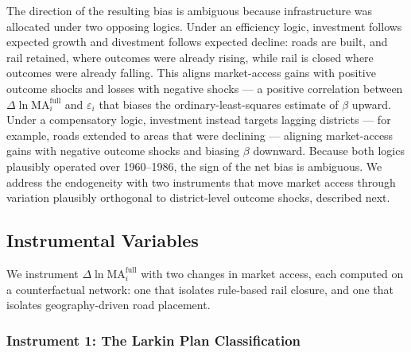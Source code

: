 The direction of the resulting bias is ambiguous because
infrastructure was allocated under two opposing logics. Under an
efficiency logic, investment follows expected growth and divestment
follows expected decline: roads are built, and rail retained, where
outcomes were already rising, while rail is closed where outcomes were
already falling. This aligns market-access gains with positive outcome
shocks and losses with negative shocks --- a positive correlation
between $\Delta \ln \mathrm{MA}^{\mathrm{full}}_i$ and $\varepsilon_i$
that biases the ordinary-least-squares estimate of $\beta$ upward.
Under a compensatory logic, investment instead targets lagging
districts --- for example, roads extended to areas that were declining
--- aligning market-access gains with negative outcome shocks and
biasing $\beta$ downward. Because both logics plausibly operated over
1960--1986, the sign of the net bias is ambiguous. We address the
endogeneity with two instruments that move market access through
variation plausibly orthogonal to district-level outcome shocks,
described next.

\subsection{Instrumental Variables}

We instrument $\Delta \ln \mathrm{MA}^{\mathrm{full}}_i$ with two
changes in market access, each computed on a counterfactual network:
one that isolates rule-based rail closure, and one that isolates
geography-driven road placement.

\subsubsection{Instrument 1: The Larkin Plan Classification}
\label{sssec:iv_larkin}

